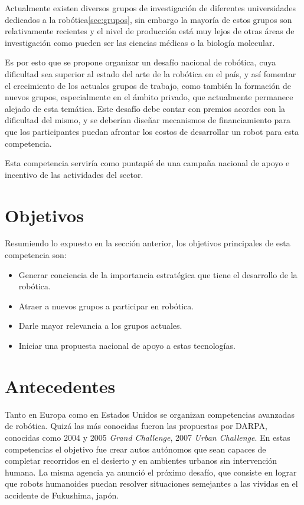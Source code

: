 \documentclass[a4paper,12pt]{article}
\begin{document}
Actualmente existen diversos grupos de investigación de diferentes universidades dedicados a la robótica\ref{sec:grupos}, sin embargo la mayoría de estos grupos son relativamente recientes y el nivel de producción está muy lejos de otras áreas de investigación como pueden ser las ciencias médicas o la biología molecular.

Es por esto que se propone organizar un desafío nacional de robótica, cuya dificultad sea superior al estado del arte de la robótica en el país, y así fomentar el crecimiento de los actuales grupos de trabajo, como también la formación de nuevos grupos, especialmente en el ámbito privado, que actualmente permanece alejado de esta temática. Este desafío debe contar con premios acordes con la dificultad del mismo, y se deberían diseñar mecanismos de financiamiento para que los participantes puedan afrontar los costos de desarrollar un robot para esta competencia.

Esta competencia serviría como puntapié de una campaña nacional de apoyo e incentivo de las actividades del sector.

\section{Objetivos}

Resumiendo lo expuesto en la sección anterior, los objetivos principales de esta competencia son:

\begin{itemize}
 \item Generar conciencia de la importancia estratégica que tiene el desarrollo de la robótica.
 \item Atraer a nuevos grupos a participar en robótica.
 \item Darle mayor relevancia a los grupos actuales.
 \item Iniciar una propuesta nacional de apoyo a estas tecnologías.
\end{itemize}

\section{Antecedentes}

Tanto en Europa como en Estados Unidos se organizan competencias avanzadas de robótica. Quizá las más conocidas fueron las propuestas por DARPA\cite{darpa}, conocidas como 2004 y 2005 \textit{Grand Challenge}, 2007 \textit{Urban Challenge}. En estas competencias el objetivo fue crear autos autónomos que sean capaces de completar recorridos en el desierto y en ambientes urbanos sin intervención humana. La misma agencia ya anunció el próximo desafío, que consiste en lograr que robots humanoides puedan resolver situaciones semejantes a las vividas en el accidente de Fukushima, japón.
\end{document}
